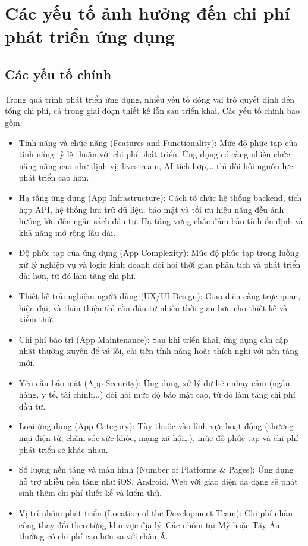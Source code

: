 \section{Các yếu tố ảnh hưởng đến chi phí phát triển ứng dụng}

\subsection{Các yếu tố chính}
\renewcommand{\labelitemi}{--}    
    \begin{flushleft}
      \hspace*{0.8cm}Trong quá trình phát triển ứng dụng, nhiều yếu tố đóng vai trò quyết định đến tổng chi phí, cả trong giai đoạn thiết kế lẫn sau triển khai. Các yếu tố chính bao gồm:
      \setlength{\leftmargini}{1.5cm}
      \begin{itemize}
          \item Tính năng và chức năng (Features and Functionality): Mức độ phức tạp của tính năng tỷ lệ thuận với chi phí phát triển. Ứng dụng có càng nhiều chức năng nâng cao như định vị, livestream, AI tích hợp,… thì đòi hỏi nguồn lực phát triển cao hơn.
          \item Hạ tầng ứng dụng (App Infrastructure): Cách tổ chức hệ thống backend, tích hợp API, hệ thống lưu trữ dữ liệu, bảo mật và tối ưu hiệu năng đều ảnh hưởng lớn đến ngân sách đầu tư. Hạ tầng vững chắc đảm bảo tính ổn định và khả năng mở rộng lâu dài.
          \item Độ phức tạp của ứng dụng (App Complexity): Mức độ phức tạp trong luồng xử lý nghiệp vụ và logic kinh doanh đòi hỏi thời gian phân tích và phát triển dài hơn, từ đó làm tăng chi phí.
          \item Thiết kế trải nghiệm người dùng (UX/UI Design): Giao diện càng trực quan, hiện đại, và thân thiện thì cần đầu tư nhiều thời gian hơn cho thiết kế và kiểm thử.
          \item Chi phí bảo trì (App Maintenance): Sau khi triển khai, ứng dụng cần cập nhật thường xuyên để vá lỗi, cải tiến tính năng hoặc thích nghi với nền tảng mới.
          \item Yêu cầu bảo mật (App Security): Ứng dụng xử lý dữ liệu nhạy cảm (ngân hàng, y tế, tài chính...) đòi hỏi mức độ bảo mật cao, từ đó làm tăng chi phí đầu tư.
          \item Loại ứng dụng (App Category): Tùy thuộc vào lĩnh vực hoạt động (thương mại điện tử, chăm sóc sức khỏe, mạng xã hội…), mức độ phức tạp và chi phí phát triển sẽ khác nhau.
          \item Số lượng nền tảng và màn hình (Number of Platforms \& Pages): Ứng dụng hỗ trợ nhiều nền tảng như iOS, Android, Web với giao diện đa dạng sẽ phát sinh thêm chi phí thiết kế và kiểm thử.
          \item Vị trí nhóm phát triển (Location of the Development Team): Chi phí nhân công thay đổi theo từng khu vực địa lý. Các nhóm tại Mỹ hoặc Tây Âu thường có chi phí cao hơn so với châu Á.
      \end{itemize}
    \end{flushleft}

